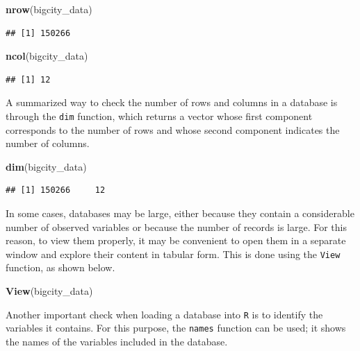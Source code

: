 \documentclass[
  english,
  12pt,
]{book}
\newenvironment{Shaded}{\begin{snugshade}}{\end{snugshade}}
\newcommand{\FunctionTok}[1]{\textcolor[rgb]{0.13,0.29,0.53}{\textbf{#1}}}
\newcommand{\NormalTok}[1]{#1}
\begin{document}
\begin{Shaded}
\begin{Highlighting}[]
\FunctionTok{nrow}\NormalTok{(bigcity\_data)}
\end{Highlighting}
\end{Shaded}

\begin{verbatim}
## [1] 150266
\end{verbatim}

\begin{Shaded}
\begin{Highlighting}[]
\FunctionTok{ncol}\NormalTok{(bigcity\_data)}
\end{Highlighting}
\end{Shaded}

\begin{verbatim}
## [1] 12
\end{verbatim}

A summarized way to check the number of rows and columns in a database is through the \texttt{dim} function, which returns a vector whose first component corresponds to the number of rows and whose second component indicates the number of columns.

\begin{Shaded}
\begin{Highlighting}[]
\FunctionTok{dim}\NormalTok{(bigcity\_data)}
\end{Highlighting}
\end{Shaded}

\begin{verbatim}
## [1] 150266     12
\end{verbatim}

In some cases, databases may be large, either because they contain a considerable number of observed variables or because the number of records is large. For this reason, to view them properly, it may be convenient to open them in a separate window and explore their content in tabular form. This is done using the \texttt{View} function, as shown below.

\begin{Shaded}
\begin{Highlighting}[]
\FunctionTok{View}\NormalTok{(bigcity\_data)}
\end{Highlighting}
\end{Shaded}

Another important check when loading a database into \texttt{R} is to identify the variables it contains. For this purpose, the \texttt{names} function can be used; it shows the names of the variables included in the database.
\end{document}
